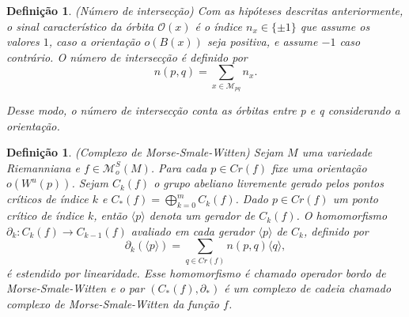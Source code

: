 \documentclass[12pt]{book}
\newtheorem{definicao}[teorema]{Definição}
\newcommand{\espacomoduli}[2]{\mathcal{M}_{#1#2}}
\newcommand{\funcoesmorsesmale}[1]{\mathcal{M}^{S}_{o}(#1)}
\newcommand{\gerador}[1]{\langle #1\rangle}
\newcommand{\orbitaponto}[1]{\mathcal{O}(#1)}
\newcommand{\pontoscriticos}[1]{\textit{Cr}(#1)}
\newcommand{\variedadeinstavel}[1]{W^{u}(#1)}
\begin{document}
	\begin{definicao}
		(Número de intersecção) Com as hipóteses descritas anteriormente, o sinal característico da órbita $\orbitaponto{x}$ é o índice $n_{x} \in \{\pm 1\}$ que assume os valores $1$, caso a orientação $o(B(x))$ seja positiva, e assume $-1$ caso contrário. O número de intersecção é definido por 
		$$
		n(p,q) = \sum_{x \in \espacomoduli{p}{q} }n_{x}.
		$$
		
		Desse modo, o número de intersecção conta as órbitas entre p e q considerando a orientação.
	\end{definicao}
	
	\begin{definicao}
		(Complexo de Morse-Smale-Witten) Sejam $M$ uma variedade Riemanniana e $f \in \funcoesmorsesmale{M}$. Para cada $p \in \pontoscriticos{f}$ fixe uma orientação $o(\variedadeinstavel{p})$. Sejam $C_{k}(f)$ o grupo abeliano livremente gerado pelos pontos críticos de índice $k$ e $C_{*}(f) =\bigoplus^{m}_{k=0}C_{k}(f)$. Dado $p \in \pontoscriticos{f}$ um ponto crítico de índice $k$, então $\gerador{p}$ denota um gerador de $C_{k}(f)$. O homomorfismo $\partial_{k}: C_{k}(f)\to C_{k-1}(f)$ avaliado em cada gerador $\gerador{p}$ de $C_{k}$, definido por
		$$
		\partial_{k}(\gerador{p})=\sum_{q \in \pontoscriticos{f}}n(p,q)\gerador{q},
		$$
		é estendido por linearidade. Esse homomorfismo é chamado operador bordo de Morse-Smale-Witten e o par $(C_{*}(f), \partial_{*})$ é um complexo de cadeia chamado complexo de Morse-Smale-Witten da função $f$.
		
	\end{definicao}
	
\end{document}
